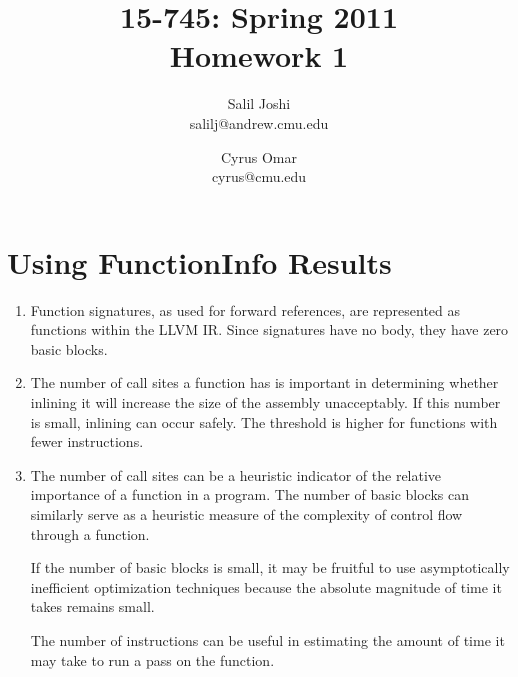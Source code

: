 \documentclass[12pt]{article}
\title{{\small 15-745: Spring 2011}\\Homework 1}
\author{Salil Joshi\\
salilj@andrew.cmu.edu
\and
Cyrus Omar\\
cyrus@cmu.edu
}
\date{}                                           %
\begin{document}
\maketitle
\section{Using FunctionInfo Results}
\begin{enumerate}
\item Function signatures, as used for forward references, are represented as functions within the LLVM IR. Since signatures have no body, they have zero basic blocks.
\item The number of call sites a function has is important in determining whether inlining it will increase the size of the assembly unacceptably. If this number is small, inlining can occur safely. The threshold is higher for functions with fewer instructions.
\item The number of call sites can be a heuristic indicator of the relative importance of a function in a program. The number of basic blocks can similarly serve as a heuristic measure of the complexity of control flow through a function. 

If the number of basic blocks is small, it may be fruitful to use asymptotically inefficient optimization techniques because the absolute magnitude of time it takes remains small.

The number of instructions can be useful in estimating the amount of time it may take to run a pass  on the function.
\end{enumerate}
\end{document}
